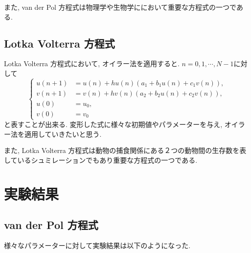 \documentclass[12pt,a4paper]{jsarticle}
\begin{document}
また, van der Pol 方程式は物理学や生物学ににおいて重要な方程式の一つである.

\subsection{Lotka Volterra 方程式}
Lotka Volterra 方程式において, オイラー法を適用すると. $n = 0, 1, \cdots , N-1$に対して
\begin{equation*}
	\left\{
	\begin{aligned}
		u(n+1) &= u(n) + hu(n)(a_1 + b_1u(n) + c_1v(n)), \\
		v(n+1) &= v(n) + hv(n)(a_2 + b_2u(n) + c_2v(n)), \\
		u(0) &= u_0, \\
		v(0) &= v_0
	\end{aligned}
	\right.
\end{equation*}
と表すことが出来る. 変形した式に様々な初期値やパラメーターを与え, オイラー法を適用していきたいと思う.

また, Lotka Volterra 方程式は動物の捕食関係にある２つの動物間の生存数を表しているシュミレーションでもあり重要な方程式の一つである.

\section{実験結果}
\subsection{van der Pol 方程式}
様々なパラメーターに対して実験結果は以下のようになった.
\end{document}
